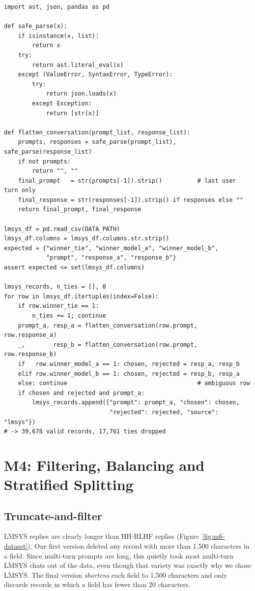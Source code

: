\begin{lstlisting}[caption={Parsing LMSYS Chatbot Arena rows into the common schema.}, label={lst:lmsys}]
import ast, json, pandas as pd

def safe_parse(x):
    if isinstance(x, list):
        return x
    try:
        return ast.literal_eval(x)
    except (ValueError, SyntaxError, TypeError):
        try:
            return json.loads(x)
        except Exception:
            return [str(x)]

def flatten_conversation(prompt_list, response_list):
    prompts, responses = safe_parse(prompt_list), safe_parse(response_list)
    if not prompts:
        return "", ""
    final_prompt   = str(prompts[-1]).strip()          # last user turn only
    final_response = str(responses[-1]).strip() if responses else ""
    return final_prompt, final_response

lmsys_df = pd.read_csv(DATA_PATH)
lmsys_df.columns = lmsys_df.columns.str.strip()
expected = {"winner_tie", "winner_model_a", "winner_model_b",
            "prompt", "response_a", "response_b"}
assert expected <= set(lmsys_df.columns)

lmsys_records, n_ties = [], 0
for row in lmsys_df.itertuples(index=False):
    if row.winner_tie == 1:
        n_ties += 1; continue
    prompt_a, resp_a = flatten_conversation(row.prompt, row.response_a)
    _,        resp_b = flatten_conversation(row.prompt, row.response_b)
    if   row.winner_model_a == 1: chosen, rejected = resp_a, resp_b
    elif row.winner_model_b == 1: chosen, rejected = resp_b, resp_a
    else: continue                                     # ambiguous row
    if chosen and rejected and prompt_a:
        lmsys_records.append({"prompt": prompt_a, "chosen": chosen,
                              "rejected": rejected, "source": "lmsys"})
# -> 39,678 valid records, 17,761 ties dropped
\end{lstlisting}

\section{M4: Filtering, Balancing and Stratified Splitting}
\label{sec:m4}

\subsection{Truncate-and-filter}
LMSYS replies are clearly longer than HH-RLHF replies (Figure~\ref{fig:m6-dataset}). Our first version deleted any record with more than 1,500 characters in a field. Since multi-turn prompts are long, this quietly took most multi-turn LMSYS chats out of the data, even though that variety was exactly why we chose LMSYS. The final version \emph{shortens} each field to 1,500 characters and only discards records in which a field has fewer than 20 characters.

